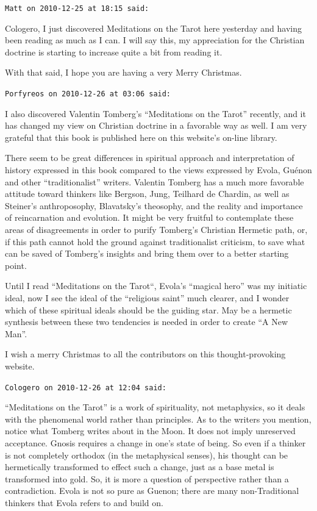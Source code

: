 \begin{footnotesize}
\begin{sffamily}
\texttt{Matt on 2010-12-25 at 18:15 said:}

Cologero, I just discovered Meditations on the Tarot here yesterday and having been reading as much as I can. I will say this, my appreciation for the Christian doctrine is starting to increase quite a bit from reading it.

With that said, I hope you are having a very Merry Christmas.

\hfill

\texttt{Porfyreos on 2010-12-26 at 03:06 said:}

I also discovered Valentin Tomberg's ``Meditations on the Tarot'' recently, and it has changed my view on Christian doctrine in a favorable way as well. I am very grateful that this book is published here on this website's on-line library.

There seem to be great differences in spiritual approach and interpretation of history expressed in this book compared to the views expressed by Evola, Guénon and other ``traditionalist'' writers. Valentin Tomberg has a much more favorable attitude toward thinkers like Bergson, Jung, Teilhard de Chardin, as well as Steiner's anthroposophy, Blavatsky's theosophy, and the reality and importance of reincarnation and evolution. It might be very fruitful to contemplate these areas of disagreements in order to purify Tomberg's Christian Hermetic path, or, if this path cannot hold the ground against traditionalist criticism, to save what can be saved of Tomberg's insights and bring them over to a better starting point.

Until I read ``Meditations on the Tarot``, Evola's ``magical hero'' was my initiatic ideal, now I see the ideal of the ``religious saint'' much clearer, and I wonder which of these spiritual ideals should be the guiding star. May be a hermetic synthesis between these two tendencies is needed in order to create ``A New Man''.

I wish a merry Christmas to all the contributors on this thought-provoking website.

\hfill

\texttt{Cologero on 2010-12-26 at 12:04 said:}

``Meditations on the Tarot'' is a work of spirituality, not metaphysics, so it deals with the phenomenal world rather than principles. As to the writers you mention, notice what Tomberg writes about in the Moon. It does not imply unreserved acceptance. Gnosis requires a change in one's state of being. So even if a thinker is not completely orthodox (in the metaphysical senses), his thought can be hermetically transformed to effect such a change, just as a base metal is transformed into gold. So, it is more a question of perspective rather than a contradiction. Evola is not so pure as Guenon; there are many non-Traditional thinkers that Evola refers to and build on.


\end{sffamily}
\end{footnotesize}
